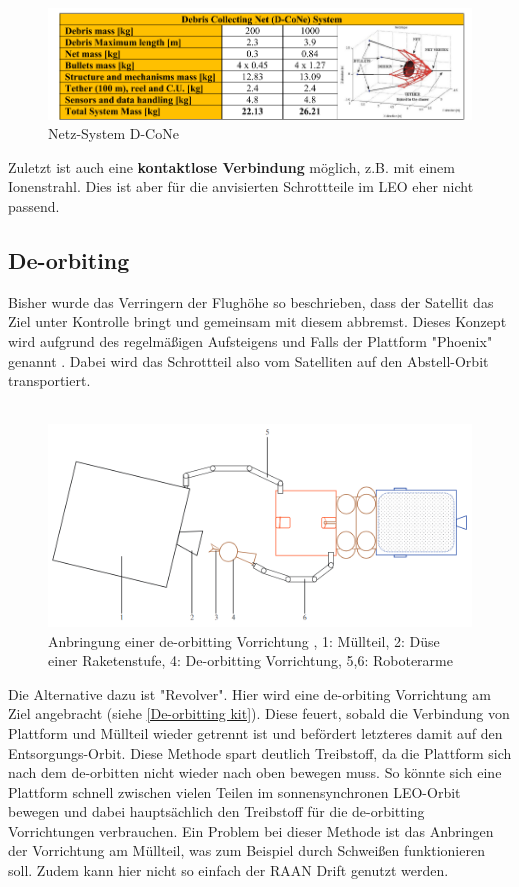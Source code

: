 \documentclass{article}
\begin{document}
\begin{figure}[H]
	\centering
	\includegraphics[width=\linewidth]{bilder/Netz.png}
	\caption{Netz-System D-CoNe \citep{ruggiero2015small}} 
	\label{Harpune}
\end{figure}
\noindent Zuletzt ist auch eine \textbf{kontaktlose Verbindung} möglich, z.B. mit einem Ionenstrahl. Dies ist aber für die anvisierten Schrottteile im LEO eher nicht passend.

\subsection{De-orbiting}
Bisher wurde das Verringern der Flughöhe so beschrieben, dass der Satellit das Ziel unter Kontrolle bringt und gemeinsam mit diesem abbremst. Dieses Konzept wird aufgrund des regelmäßigen Aufsteigens und Falls der Plattform "Phoenix" genannt \citep{covello2012application}. Dabei wird das Schrottteil also vom Satelliten auf den Abstell-Orbit transportiert. \\\\
\begin{figure}[H]
	\centering
	\includegraphics[width=0.8\linewidth]{bilder/Revolver.png}
	\caption{Anbringung einer de-orbitting Vorrichtung \citep{castronuovo2011active}, 1: Müllteil, 2: Düse einer Raketenstufe, 4: De-orbitting Vorrichtung, 5,6: Roboterarme}
	\label{De-orbitting kit}
\end{figure}
\noindent Die Alternative dazu ist "Revolver". Hier wird eine de-orbiting Vorrichtung am Ziel angebracht (siehe \autoref{De-orbitting kit}). Diese feuert, sobald die Verbindung von Plattform und Müllteil wieder getrennt ist und befördert letzteres damit auf den Entsorgungs-Orbit. Diese Methode spart deutlich Treibstoff, da die Plattform sich nach dem de-orbitten nicht wieder nach oben bewegen muss. So könnte sich eine Plattform schnell zwischen vielen Teilen im sonnensynchronen LEO-Orbit bewegen und dabei hauptsächlich den Treibstoff für die de-orbitting Vorrichtungen verbrauchen. Ein Problem bei dieser Methode ist das Anbringen der Vorrichtung am Müllteil, was zum Beispiel durch Schweißen funktionieren soll. Zudem kann hier nicht so einfach der RAAN Drift genutzt werden. \\\\
\end{document}
